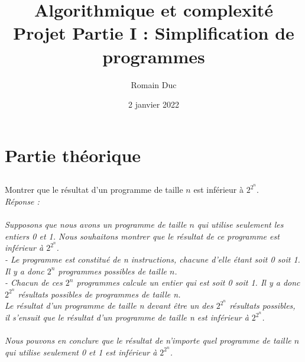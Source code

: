 \documentclass[a4paper,11pt]{article}
\title{Algorithmique et complexité Projet Partie I : Simplification de programmes}
\author{Romain Duc}
\date{2 janvier 2022}
\begin{document}
    
    \maketitle
    \newpage
    \setcounter{section}{3}
    \section{Partie théorique}
    
	\setcounter{subsection}{5}
        \subsection{}\label{subsec:Q6}
        Montrer que le résultat d'un programme de taille $n$ est inférieur à $2^{2^{n}}$.\\
		\textit{ Réponse : \\\\
		Supposons que nous avons un programme de taille $n$ qui utilise seulement les entiers 0 et 1. Nous souhaitons montrer que le résultat de ce programme est inférieur à $2^{2^{n}}$.\\
- Le programme est constitué de n instructions, chacune d'elle étant soit 0 soit 1. Il y a donc $2^n$ programmes possibles de taille $n$.\\
- Chacun de ces $2^n$ programmes calcule un entier qui est soit 0 soit 1. Il y a donc $2^{2^{n}}$ résultats possibles de programmes de taille n.\\
Le résultat d'un programme de taille n devant être un des $2^{2^{n}}$ résultats possibles, il s'ensuit que le résultat d'un programme de taille n est inférieur à $2^{2^{n}}$.\\\\
Nous pouvons en conclure que le résultat de n'importe quel programme de taille $n$ qui utilise seulement 0 et 1 est inférieur à $2^{2^{n}}$.}
\end{document}
